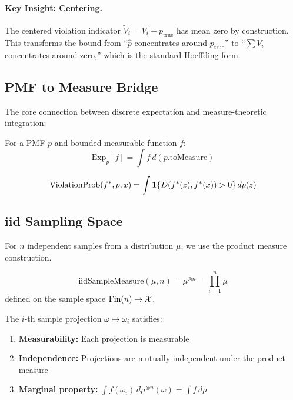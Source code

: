 \paragraph{Key Insight: Centering.}
The centered violation indicator $\tilde{V}_i = V_i - p_{\text{true}}$ has mean zero by construction. This transforms the bound from ``$\hat{p}$ concentrates around $p_{\text{true}}$'' to ``$\sum \tilde{V}_i$ concentrates around zero,'' which is the standard Hoeffding form.

\subsection{PMF to Measure Bridge}

The core connection between discrete expectation and measure-theoretic integration:

\begin{definition}
For a PMF $p$ and bounded measurable function $f$:
\[
\text{Exp}_p[f] = \int f \, d(p.\text{toMeasure})
\]
\end{definition}

\begin{lemma}
\[
\text{ViolationProb}(f^{\ast}, p, x) = \int \mathbf{1}\{D(f^{\ast}(z), f^{\ast}(x)) > 0\} \, dp(z)
\]
\end{lemma}

\subsection{iid Sampling Space}

For $n$ independent samples from a distribution $\mu$, we use the product measure construction.

\begin{definition}
\[
\text{iidSampleMeasure}(\mu, n) = \mu^{\otimes n} = \prod_{i=1}^n \mu
\]
defined on the sample space $\text{Fin}(n) \to \mathcal{X}$.
\end{definition}

\begin{lemma}
The $i$-th sample projection $\omega \mapsto \omega_i$ satisfies:
\begin{enumerate}
    \item \textbf{Measurability:} Each projection is measurable
    \item \textbf{Independence:} Projections are mutually independent under the product measure
    \item \textbf{Marginal property:} $\int f(\omega_i) \, d\mu^{\otimes n}(\omega) = \int f \, d\mu$
\end{enumerate}
\end{lemma}

